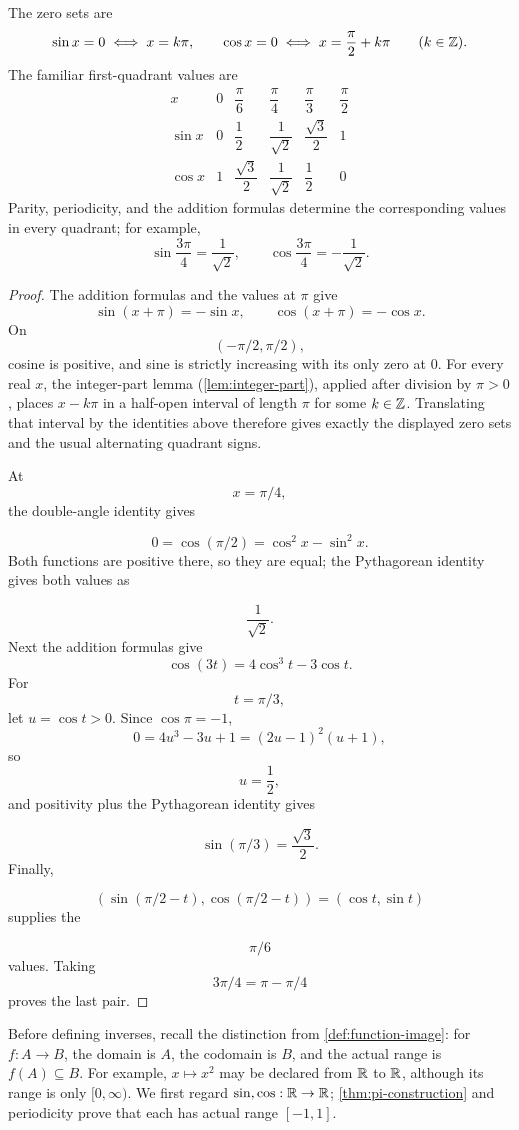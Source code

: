 \begin{proposition}
\label{prop:trigonometric-special-values}
The zero sets are
\[
\sin x=0\iff x=k\pi,
\qquad
\cos x=0\iff x=\frac{\pi}{2}+k\pi
\qquad(k\in\mathbb{Z}).
\]
The familiar first-quadrant values are
\begingroup
\renewcommand{\arraystretch}{1.7}
\[
\begin{array}{c|ccccc}
x&0&\dfrac{\pi}{6}&\dfrac{\pi}{4}&\dfrac{\pi}{3}&\dfrac{\pi}{2}\\ \hline
\sin x&0&\dfrac12&\dfrac1{\sqrt2}&\dfrac{\sqrt3}{2}&1\\[1mm]
\cos x&1&\dfrac{\sqrt3}{2}&\dfrac1{\sqrt2}&\dfrac12&0
\end{array}
\]
\endgroup
Parity, periodicity, and the addition formulas determine the corresponding
values in every quadrant; for example,
\[
\sin\frac{3\pi}{4}=\frac1{\sqrt2},
\qquad
\cos\frac{3\pi}{4}=-\frac1{\sqrt2}.
\]
\end{proposition}
\begin{proof}
The addition formulas and the values at \(\pi\) give
\[
\sin(x+\pi)=-\sin x,
\qquad
\cos(x+\pi)=-\cos x.
\]
On
\[
(-\pi/2,\pi/2),
\]
 cosine is positive, and sine is strictly
increasing with its only zero at \(0\). For every real \(x\), the
integer-part lemma (\cref{lem:integer-part}), applied after division by
\(\pi>0\), places \(x-k\pi\) in a half-open interval of length \(\pi\)
for some \(k\in\mathbb{Z}\). Translating that interval by the identities above
therefore gives exactly the displayed zero sets and the usual alternating
quadrant signs.

At
\[
x=\pi/4,
\]
 the double-angle identity gives

\[
0=\cos(\pi/2)=\cos^2x-\sin^2x.
\]
 Both functions are positive there,
so they are equal; the Pythagorean identity gives both values as

\[
\frac1{\sqrt2}.
\]
 Next the addition formulas give
\[
\cos(3t)=4\cos^3t-3\cos t.
\]
For
\[
t=\pi/3,
\]
 let \(u=\cos t>0\). Since \(\cos\pi=-1\),
\[
0=4u^3-3u+1=(2u-1)^2(u+1),
\]
so
\[
u=\frac12,
\]
 and positivity plus the Pythagorean identity gives

\[
\sin(\pi/3)=\frac{\sqrt3}{2}.
\]
 Finally,

\[
(\sin(\pi/2-t),\cos(\pi/2-t))=(\cos t,\sin t)
\]
 supplies the

\[
\pi/6
\]
 values. Taking
\[
3\pi/4=\pi-\pi/4
\]
 proves the last pair.
\end{proof}

Before defining inverses, recall the distinction from
\cref{def:function-image}: for \(f:A\to B\), the domain is \(A\), the
codomain is \(B\), and the actual range is \(f(A)\subseteq B\). For example,
\(x\mapsto x^2\) may be declared from \(\mathbb{R}\) to \(\mathbb{R}\), although its range
is only \([0,\infty)\). We first regard
\(\sin,\cos:\mathbb{R}\to\mathbb{R}\); \cref{thm:pi-construction} and periodicity prove
that each has actual range \([-1,1]\).

